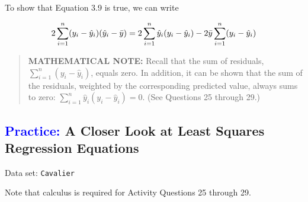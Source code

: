 \documentclass[
]{report}
\begin{document}
To show that Equation 3.9 is true, we can write

\begin{equation}
2 \sum_{i=1}^n (y_i - \hat{y}_i)(\hat{y}_i - \bar{y})
  = 2 \sum_{i=1}^n \hat{y}_i (y_i - \hat{y}_i)  - 2 \bar{y} \sum_{i=1}^n (y_i - \hat{y}_i)
\notag  
\end{equation}

\begin{quote}
\textbf{MATHEMATICAL NOTE:} Recall that the sum of residuals, \(\scriptstyle \sum_{i=1}^n (y_i - \hat{y}_i)\), equals zero. In addition, it can be shown that the sum of the residuals, weighted by the corresponding predicted value, always sums to zero: \(\scriptstyle \sum_{i=1}^n \hat{y}_i (y_i - \hat{y}_i) = 0.\) (See Questions 25 through 29.)
\end{quote}

\hypertarget{a-closer-look-at-least-squares-regression-equations}{%
\subsection*{\texorpdfstring{\textcolor{blue}{Practice:} A Closer Look at Least Squares Regression Equations}{ A Closer Look at Least Squares Regression Equations}}\label{a-closer-look-at-least-squares-regression-equations}}

\vspace{-1em}

Data set: \texttt{Cavalier}

Note that calculus is required for Activity Questions 25 through 29.
\end{document}
